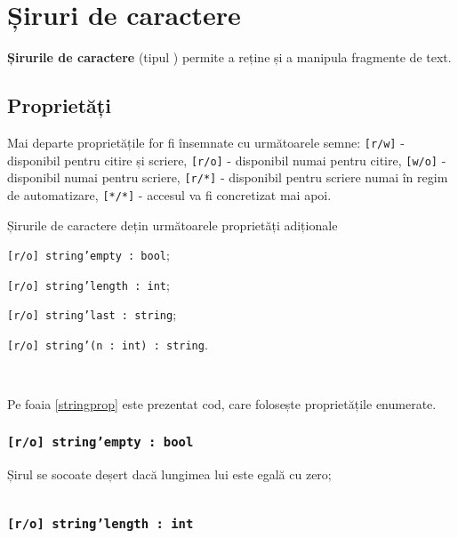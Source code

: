 \section{Șiruri de caractere}

{\bf Șirurile de caractere} (tipul \str{}) permite a reține și a manipula fragmente de text. 

\subsection{Proprietăți}

Mai departe proprietățile for fi însemnate cu următoarele semne: \texttt{[r/w]} - disponibil pentru citire și scriere, \texttt{[r/o]} - disponibil numai pentru citire, \texttt{[w/o]} - disponibil numai pentru scriere,  \texttt{[r/*]} - disponibil pentru scriere numai în regim de automatizare, \texttt{[*/*]} - accesul va fi concretizat mai apoi.

Șirurile de caractere dețin următoarele proprietăți adiționale
\begin{icItems}
\item
	\texttt{[r/o] string'empty : bool};
\item
	\texttt{[r/o] string'length : int};
\item
	\texttt{[r/o] string'last : string};
\item
	\texttt{[r/o] string'(n : int) : string}.
\end{icItems}

\

Pe foaia \ref{stringprop} este prezentat cod, care folosește proprietățile enumerate.

\subsubsection{\texttt{[r/o] string'empty : bool}}

Șirul se socoate deșert dacă lungimea lui este egală cu zero;

\begin{sourcecode}
\label{stringprop}
\inputminted[linenos]{icl}{../sources/stringprop.icL}
\end{sourcecode}

\subsubsection{\texttt{[r/o] string'length : int}}

